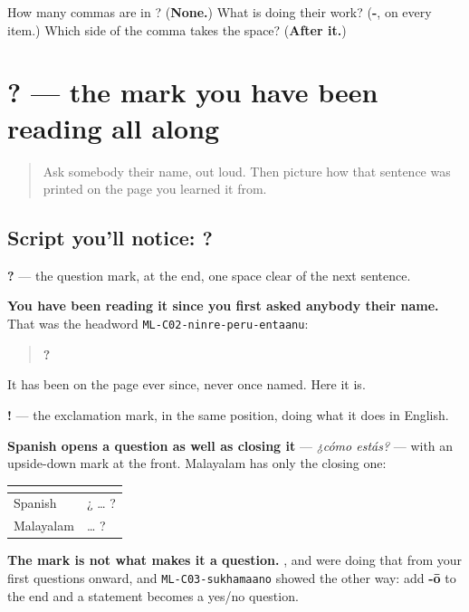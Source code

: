 \begin{tcolorbox}[breakable,colback=teal!4,colframe=teal!35!black,title={Before you move on}]
How many commas are in \textbf{  }? (\textbf{None.}) What is doing their work? (\textbf{-}, on every item.) Which side of the comma takes the space? (\textbf{After it.})
\end{tcolorbox}
\section[? (question mark, exclamation mark)]{? — the mark you have been reading all along}

\label{lesson:ML-W108-question-mark}



\begin{quote}
Ask somebody their name, out loud. Then picture how that sentence was printed on the page you learned it from.
\end{quote}

\subsection*{Script you'll notice: ?}
\textbf{?} — the question mark, at the end, one space clear of the next sentence.

\textbf{You have been reading it since you first asked anybody their name.} That was the headword \texttt{ML-C02-ninre-peru-entaanu}:

\begin{quote}
\textbf{  ?}
\end{quote}

It has been on the page ever since, never once named. Here it is.

\textbf{!} — the exclamation mark, in the same position, doing what it does in English.

\begin{grammarlens}[title={Grammar Lens: one mark, at the end, and nothing at the front}]
\textbf{Spanish opens a question as well as closing it} — \emph{¿cómo estás?} — with an upside-down mark at the front. Malayalam has only the closing one:

\noindent
\begin{tabularx}{\linewidth}{@{}>{\raggedright\arraybackslash}X>{\raggedright\arraybackslash}X@{}}
\toprule
\textbf{} & \textbf{} \\
\midrule
Spanish & ¿ … ? \\
Malayalam & … ? \\
\bottomrule
\end{tabularx}

\textbf{The mark is not what makes it a question.} \textbf{}, \textbf{} and \textbf{} were doing that from your first questions onward, and \texttt{ML-C03-sukhamaano} showed the other way: add \textbf{-ō} to the end and a statement becomes a yes/no question.
\end{grammarlens}

